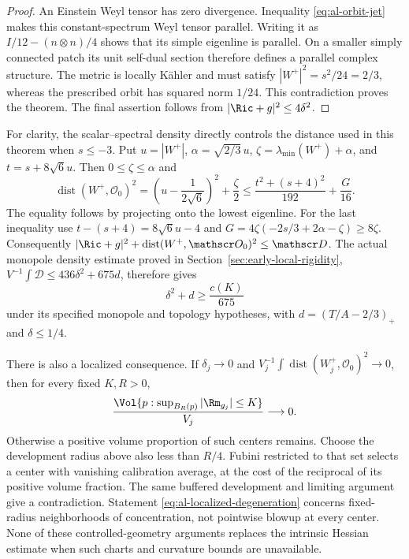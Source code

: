 \begin{proof}
An Einstein Weyl tensor has zero divergence.  Inequality
\eqref{eq:al-orbit-jet} makes this constant-spectrum Weyl tensor parallel.
Writing it as $I/12-(n\otimes n)/4$ shows that its simple eigenline is
parallel.  On a smaller simply connected patch its unit self-dual section
therefore defines a parallel complex structure.  The metric is locally
K\"ahler and must satisfy $|W^+|^2=s^2/24=2/3$, whereas the prescribed
orbit has squared norm $1/24$.  This contradiction proves the theorem.
The final assertion follows from $|\Ric+g|^2\le4\delta^2$.
\end{proof}

For clarity, the scalar--spectral density directly controls the distance
used in this theorem when $s\le-3$.  Put
$u=|W^+|$, $\alpha=\sqrt{2/3}\,u$, $\zeta=\lambda_{\min}(W^+)+\alpha$,
and $t=s+8\sqrt6u$.  Then $0\le\zeta\le\alpha$ and
\[
 \operatorname{dist}(W^+,\mathscr O_0)^2
 =\left(u-\frac1{2\sqrt6}\right)^2+\frac\zeta2
 \le\frac{t^2+(s+4)^2}{192}+\frac G{16}.
\]
The equality follows by projecting onto the lowest eigenline.  For the
last inequality use $t-(s+4)=8\sqrt6u-4$ and
$G=4\zeta(-2s/3+2\alpha-\zeta)\ge8\zeta$.
Consequently $|\Ric+g|^2+\operatorname{dist}(W^+,\mathscr O_0)^2
\le\mathscr D$.  The actual monopole density estimate proved in
Section~\ref{sec:early-local-rigidity},
$V^{-1}\int\mathscr D\le436\delta^2+675d$, therefore gives
\[
 \delta^2+d\ge\frac{c(K)}{675}
\]
under its specified monopole and topology hypotheses, with
$d=(T/A-2/3)_+$ and $\delta\le1/4$.

There is also a localized consequence.  If $\delta_j\to0$ and
$V_j^{-1}\int\operatorname{dist}(W_j^+,\mathscr O_0)^2\to0$, then for
every fixed $K,R>0$,
\begin{equation}\label{eq:al-localized-degeneration}
 \frac{\Vol\{p:\sup_{B_R(p)}|\Rm_{g_j}|\le K\}}{V_j}
 \longrightarrow0.
\end{equation}
Otherwise a positive volume proportion of such centers remains.  Choose
the development radius above also less than $R/4$.  Fubini restricted to
that set selects a center with vanishing calibration average, at the cost
of the reciprocal of its positive volume fraction.  The same buffered
development and limiting argument give a contradiction.  Statement
\eqref{eq:al-localized-degeneration} concerns fixed-radius neighborhoods
of concentration, not pointwise blowup at every center.  None of these
controlled-geometry arguments replaces the intrinsic Hessian estimate
when such charts and curvature bounds are unavailable.

